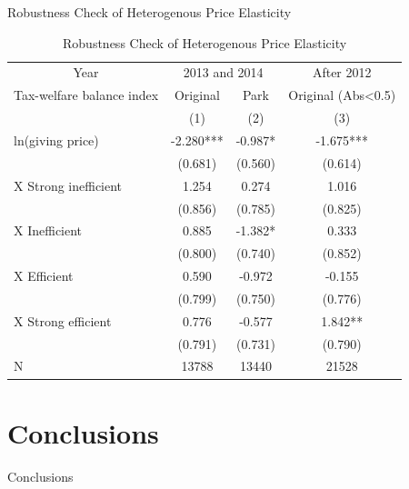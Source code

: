 \documentclass[
  ignorenonframetext,
]{beamer}
\begin{document}
\begin{frame}{Robustness Check of Heterogenous Price Elasticity}
\protect\hypertarget{robustness-check-of-heterogenous-price-elasticity-1}{}

\begin{table}

\caption{\label{tab:kableRobust1EstimateInteractionByBalanceGroup}Robustness Check of Heterogenous Price Elasticity}
\centering
\fontsize{8}{10}\selectfont
\begin{tabular}[t]{lccc}
\toprule
\multicolumn{1}{c}{Year} & \multicolumn{2}{c}{2013 and 2014} & \multicolumn{1}{c}{After 2012} \\
\cmidrule(l{3pt}r{3pt}){1-1} \cmidrule(l{3pt}r{3pt}){2-3} \cmidrule(l{3pt}r{3pt}){4-4}
\multicolumn{1}{c}{Tax-welfare balance index} & \multicolumn{1}{c}{Original} & \multicolumn{1}{c}{Park} & \multicolumn{1}{c}{Original (Abs<0.5)} \\
\cmidrule(l{3pt}r{3pt}){1-1} \cmidrule(l{3pt}r{3pt}){2-2} \cmidrule(l{3pt}r{3pt}){3-3} \cmidrule(l{3pt}r{3pt}){4-4}
 & (1) & (2) & (3)\\
\midrule
ln(giving price) & -2.280*** & -0.987* & -1.675***\\
 & (0.681) & (0.560) & (0.614)\\
\hspace{1em}X Strong inefficient & 1.254 & 0.274 & 1.016\\
\hspace{1em} & (0.856) & (0.785) & (0.825)\\
\hspace{1em}X Inefficient & 0.885 & -1.382* & 0.333\\
\hspace{1em} & (0.800) & (0.740) & (0.852)\\
\hspace{1em}X Efficient & 0.590 & -0.972 & -0.155\\
\hspace{1em} & (0.799) & (0.750) & (0.776)\\
\hspace{1em}X Strong efficient & 0.776 & -0.577 & 1.842**\\
\hspace{1em} & (0.791) & (0.731) & (0.790)\\
N & 13788 & 13440 & 21528\\
\bottomrule
\end{tabular}
\end{table}

\end{frame}

\hypertarget{conclusions}{%
\section{Conclusions}\label{conclusions}}

\begin{frame}{Conclusions}
\protect\hypertarget{conclusions-1}{}

\end{frame}
\end{document}
